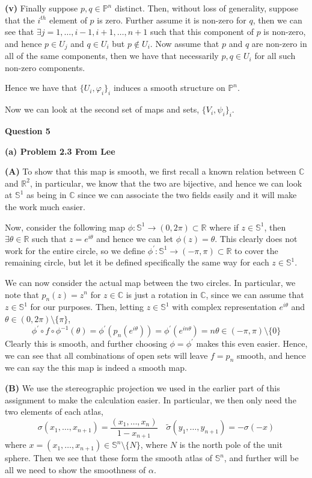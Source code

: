 \documentclass[10pt]{article}
\newcommand{\R}{\mathbb{R}}
\newcommand{\C}{\mathbb{C}}
\newcommand{\Sp}{\mathbb{S}}
\newcommand{\Pro}{\mathbb{P}}
\begin{document}
\textbf{(v)} Finally suppose $p,q\in \Pro^{n}$ distinct. Then, without loss of generality, suppose that the $i^{th}$ element of $p$ is zero. Further assume it is non-zero for $q$, then we can see that $\exists j = 1,\dots,i-1,i+1,\dots,n+1$ such that this component of $p$ is non-zero, and hence $p\in U_{j}$ and $q\in U_{i}$ but $p\notin U_{i}$. Now assume that $p$ and $q$ are non-zero in all of the same components, then we have that necessarily $p,q\in U_{i}$ for all such non-zero components.

Hence we have that $\{U_{i},\varphi_{i}\}_{i}$ induces a smooth structure on $\Pro^{n}$.

Now we can look at the second set of maps and sets, $\{V_{i},\psi_{i}\}_{i}$.

\newpage

\textbf{Question 5}

\textbf{(a) Problem 2.3 From Lee}

\textbf{(A)} To show that this map is smooth, we first recall a known relation between $\C$ and $\R^{2}$, in particular, we know that the two are bijective, and hence we can look at $\Sp^{1}$ as being in $\C$ since we can associate the two fields easily and it will make the work much easier.

Now, consider the following map $\phi: \Sp^{1} \to (0,2\pi) \subset \R$ where if $z \in \Sp^{1}$, then $\exists \theta \in \R$ such that $z = e^{i\theta}$ and hence we can let $\phi(z) = \theta$. This clearly does not work for the entire circle, so we define $\phi^{\prime}: \Sp^{1} \to (-\pi,\pi) \subset \R$ to cover the remaining circle, but let it be defined specifically the same way for each $z\in \Sp^{1}$.

We can now consider the actual map between the two circles. In particular, we note that $p_{n}(z) = z^{n}$ for $z\in \C$ is just a rotation in $\C$, since we can assume that $z\in \Sp^{1}$ for our purposes. Then, letting $z\in \Sp^{1}$ with complex representation $e^{i\theta}$ and $\theta\in (0,2\pi)\setminus \{\pi\}$,
$$\phi^{\prime}\circ f \circ \phi^{-1} (\theta) = \phi^{\prime}\left(p_{n}(e^{i\theta})\right) = \phi^{\prime}\left(e^{in\theta}\right) = n\theta \in (-\pi,\pi)\setminus\{0\}$$
Clearly this is smooth, and further choosing $\phi = \phi^{\prime}$ makes this even easier. Hence, we can see that all combinations of open sets will leave $f = p_{n}$ smooth, and hence we can say the this map is indeed a smooth map.

\textbf{(B)} We use the stereographic projection we used in the earlier part of this assignment to make the calculation easier. In particular, we then only need the two elements of each atlas,
$$\sigma(x_{1},\dots,x_{n+1}) = \frac{(x_{1},\dots,x_{n})}{1-x_{n+1}} \hspace{1em} \tilde{\sigma}(y_{1},\dots,y_{n+1}) = -\sigma(-x)$$
where $x = (x_{1},\dots,x_{n+1})\in \Sp^{n}\setminus \{N\}$, where $N$ is the north pole of the unit sphere. Then we see that these form the smooth atlas of $\Sp^{n}$, and further will be all we need to show the smoothness of $\alpha$.
\end{document}

